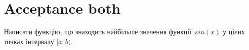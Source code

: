 \documentclass[12pt]{article}
\begin{document}
\section*{Acceptance both}

Написати функцію, що знаходить найбільше значення функції~$sin(x)$ у цілих точках інтервалу $[a; b)$.


\end{document}
